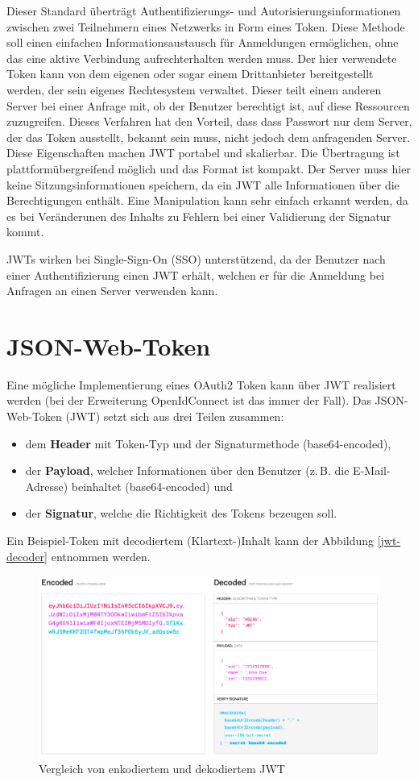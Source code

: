 Dieser Standard überträgt Authentifizierungs- und Autorisierungsinformationen zwischen zwei Teilnehmern eines Netzwerks in Form eines Token.
Diese Methode soll einen einfachen Informationsaustausch für Anmeldungen ermöglichen, ohne das eine aktive Verbindung aufrechterhalten werden muss.
Der hier verwendete Token kann von dem eigenen oder sogar einem Drittanbieter bereitgestellt werden, der sein eigenes Rechtesystem verwaltet. 
Dieser teilt einem anderen Server bei einer Anfrage mit, ob der Benutzer berechtigt ist, auf diese Ressourcen zuzugreifen.
Dieses Verfahren hat den Vorteil, dass dass Passwort nur dem Server, der das Token ausstellt, bekannt sein muss, nicht jedoch dem anfragenden Server.
Diese Eigenschaften machen JWT portabel und skalierbar. 
Die Übertragung ist plattformübergreifend möglich und das Format ist kompakt. 
Der Server muss hier keine Sitzungsinformationen speichern, da ein JWT alle Informationen über die Berechtigungen enthält. 
Eine Manipulation kann sehr einfach erkannt werden, da es bei Veränderunen des Inhalts zu Fehlern bei einer Validierung der Signatur kommt.\cite{ionos-jwt}

JWTs wirken bei Single-Sign-On (SSO) unterstützend, da der Benutzer nach einer Authentifizierung einen JWT erhält, welchen er für die Anmeldung bei Anfragen an einen Server verwenden kann.

\section{JSON-Web-Token}
Eine mögliche Implementierung eines OAuth2 Token kann über JWT realisiert werden (bei der Erweiterung OpenIdConnect ist das immer der Fall).
Das JSON-Web-Token (JWT) setzt sich aus drei Teilen zusammen: 
\begin{itemize}
	\item dem \textbf{Header} mit Token-Typ und der Signaturmethode (base64-encoded),
	\item der \textbf{Payload}, welcher Informationen über den Benutzer (z.\,B. die E-Mail-Adresse) beinhaltet (base64-encoded) und 
	\item der \textbf{Signatur}, welche die Richtigkeit des Tokens bezeugen soll.\cite{jwt}
\end{itemize}

\noindent Ein Beispiel-Token mit decodiertem (Klartext-)Inhalt kann der Abbildung \vref{jwt-decoder} entnommen werden.

\begin{figure}[ht]
	\centering
	\includegraphics[width=.8\linewidth]{jwt.png}
	\caption{Vergleich von enkodiertem und dekodiertem JWT}
	\label{jwt-decoder}
\end{figure}

